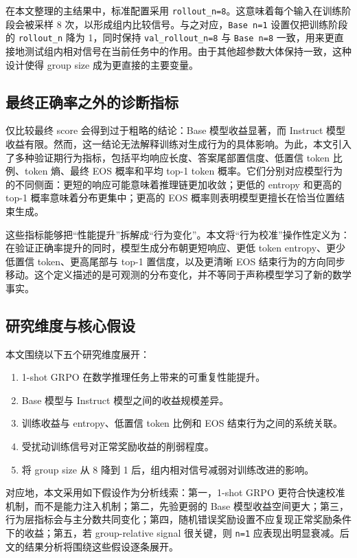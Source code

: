 \documentclass[12pt,a4paper]{ctexart}
\begin{document}
在本文整理的主结果中，标准配置采用 \texttt{rollout\_n=8}。这意味着每个输入在训练阶段会被采样 8 次，以形成组内比较信号。与之对应，\texttt{Base n=1} 设置仅把训练阶段的 \texttt{rollout\_n} 降为 1，同时保持 \texttt{val\_rollout\_n=8} 与 \texttt{Base n=8} 一致，用来更直接地测试组内相对信号在当前任务中的作用。由于其他超参数大体保持一致，这种设计使得 group size 成为更直接的主要变量。

\subsection{最终正确率之外的诊断指标}

仅比较最终 score 会得到过于粗略的结论：Base 模型收益显著，而 Instruct 模型收益有限。然而，这一结论无法解释训练对生成行为的具体影响。为此，本文引入了多种验证期行为指标，包括平均响应长度、答案尾部置信度、低置信 token 比例、token 熵、最终 EOS 概率和平均 top-1 token 概率。它们分别对应模型行为的不同侧面：更短的响应可能意味着推理链更加收敛；更低的 entropy 和更高的 top-1 概率意味着分布更集中；更高的 EOS 概率则表明模型更擅长在恰当位置结束生成。

这些指标能够把“性能提升”拆解成“行为变化”。本文将“行为校准”操作性定义为：在验证正确率提升的同时，模型生成分布朝更短响应、更低 token entropy、更少低置信 token、更高尾部与 top-1 置信度，以及更清晰 EOS 结束行为的方向同步移动。这个定义描述的是可观测的分布变化，并不等同于声称模型学习了新的数学事实。

\subsection{研究维度与核心假设}

本文围绕以下五个研究维度展开：

\begin{enumerate}
    \item 1-shot GRPO 在数学推理任务上带来的可重复性能提升。
    \item Base 模型与 Instruct 模型之间的收益规模差异。
    \item 训练收益与 entropy、低置信 token 比例和 EOS 结束行为之间的系统关联。
    \item 受扰动训练信号对正常奖励收益的削弱程度。
    \item 将 group size 从 8 降到 1 后，组内相对信号减弱对训练改进的影响。
\end{enumerate}

对应地，本文采用如下假设作为分析线索：第一，1-shot GRPO 更符合快速校准机制，而不是能力注入机制；第二，先验更弱的 Base 模型收益空间更大；第三，行为层指标会与主分数共同变化；第四，随机错误奖励设置不应复现正常奖励条件下的收益；第五，若 group-relative signal 很关键，则 \texttt{n=1} 应表现出明显衰减。后文的结果分析将围绕这些假设逐条展开。
\end{document}
